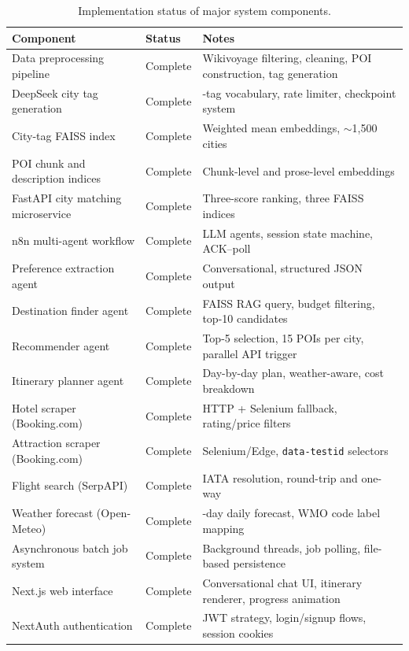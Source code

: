 \documentclass[12pt,a4paper]{report}
\begin{document}
\begin{table}[H]
\centering
\small
\renewcommand{\arraystretch}{1.3}
\begin{tabularx}{\textwidth}{
    >{\raggedright\arraybackslash}p{5.4cm}
    >{\centering\arraybackslash}p{1.8cm}
    >{\raggedright\arraybackslash}X}
\toprule
\textbf{Component} & \textbf{Status} & \textbf{Notes} \\
\midrule
Data preprocessing pipeline       & Complete & Wikivoyage filtering, cleaning, POI construction, tag generation \\
DeepSeek city tag generation      & Complete & 22-tag vocabulary, rate limiter, checkpoint system \\
City-tag FAISS index              & Complete & Weighted mean embeddings, $\sim$1{,}500 cities \\
POI chunk and description indices & Complete & Chunk-level and prose-level embeddings \\
FastAPI city matching microservice & Complete & Three-score ranking, three FAISS indices \\
n8n multi-agent workflow          & Complete & 4 LLM agents, session state machine, ACK--poll \\
Preference extraction agent       & Complete & Conversational, structured JSON output \\
Destination finder agent          & Complete & FAISS RAG query, budget filtering, top-10 candidates \\
Recommender agent                 & Complete & Top-5 selection, 15 POIs per city, parallel API trigger \\
Itinerary planner agent           & Complete & Day-by-day plan, weather-aware, cost breakdown \\
Hotel scraper (Booking.com)       & Complete & HTTP + Selenium fallback, rating/price filters \\
Attraction scraper (Booking.com)  & Complete & Selenium/Edge, \texttt{data-testid} selectors \\
Flight search (SerpAPI)           & Complete & IATA resolution, round-trip and one-way \\
Weather forecast (Open-Meteo)     & Complete & 16-day daily forecast, WMO code label mapping \\
Asynchronous batch job system     & Complete & Background threads, job polling, file-based persistence \\
Next.js web interface             & Complete & Conversational chat UI, itinerary renderer, progress animation \\
NextAuth authentication           & Complete & JWT strategy, login/signup flows, session cookies \\
\bottomrule
\end{tabularx}
\caption{Implementation status of major system components.}
\label{tab:implemented}
\end{table}
\end{document}
